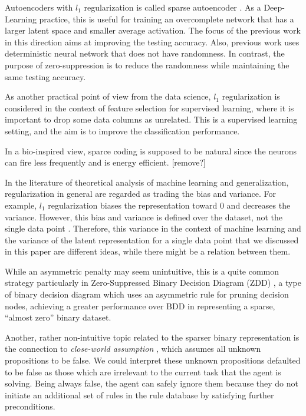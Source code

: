 Autoencoders with $l_1$ regularization is called sparse autoencoder \cite{ng2011cs294a}.
As a Deep-Learning practice,
this is useful for training an overcomplete network that has a larger latent space and smaller average activation.
The focus of the previous work in this direction aims at improving the testing accuracy.
Also, previous work uses deterministic neural network that does not have randomness.
In contrast, the purpose of zero-suppression is to reduce the randomness
while maintaining the same testing accuracy.

As another practical point of view from the data science,
$l_1$ regularization is considered in the context of feature selection for supervised learning,
where it is important to drop some data columns as unrelated.
This is a supervised learning setting, and the aim is to improve the classification performance.

In a bio-inspired view, sparce coding is supposed to be natural since
the neurons can fire less frequently and is energy efficient. [remove?]

In the literature of theoretical analysis of machine learning and generalization,
regularization in general are regarded as trading the bias and variance.
For example, $l_1$ regularization biases the representation toward 0 and decreases the variance.
However, this bias and variance is defined over the dataset, not the single data point \cite{deeplearningbook}.
Therefore, this variance in the context of machine learning and the variance of the latent representation
for a single data point that we discussed in this paper are different ideas, while there might be
a relation between them.

While an asymmetric penalty may seem unintuitive, this is a quite common
strategy particularly in Zero-Suppressed Binary Decision Diagram (ZDD)
\cite{minato1993zero}, a type of binary decision diagram \cite{bryant1986graph} which
uses an asymmetric rule for pruning decision nodes, achieving a greater
performance over BDD in representing a sparse, ``almost zero'' binary dataset.

Another, rather non-intuitive topic related to the sparser binary representation
is the connection to \emph{close-world assumption} \cite{reiter1981closed}, which assumes all unknown
propositions to be false.
% 
We could interpret these unknown propositions defaulted to be false as those which are irrelevant
to the current task that the agent is solving.
Being always false, the agent can safely ignore them because
they do not initiate an additional set of rules in the rule database by satisfying further preconditions.

